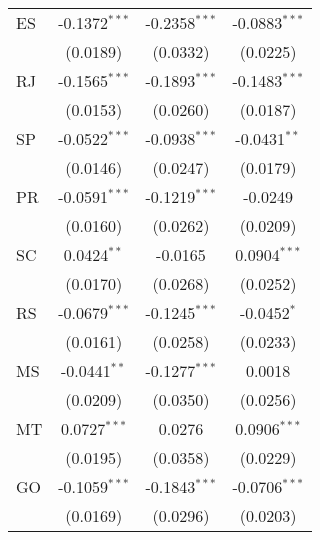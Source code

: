 \begin{tabular}{lccc}
   ES                              & -0.1372$^{***}$              & -0.2358$^{***}$        & -0.0883$^{***}$\\   
                                   & (0.0189)                     & (0.0332)               & (0.0225)\\   
   RJ                              & -0.1565$^{***}$              & -0.1893$^{***}$        & -0.1483$^{***}$\\   
                                   & (0.0153)                     & (0.0260)               & (0.0187)\\   
   SP                              & -0.0522$^{***}$              & -0.0938$^{***}$        & -0.0431$^{**}$\\   
                                   & (0.0146)                     & (0.0247)               & (0.0179)\\   
   PR                              & -0.0591$^{***}$              & -0.1219$^{***}$        & -0.0249\\   
                                   & (0.0160)                     & (0.0262)               & (0.0209)\\   
   SC                              & 0.0424$^{**}$                & -0.0165                & 0.0904$^{***}$\\   
                                   & (0.0170)                     & (0.0268)               & (0.0252)\\   
   RS                              & -0.0679$^{***}$              & -0.1245$^{***}$        & -0.0452$^{*}$\\   
                                   & (0.0161)                     & (0.0258)               & (0.0233)\\   
   MS                              & -0.0441$^{**}$               & -0.1277$^{***}$        & 0.0018\\   
                                   & (0.0209)                     & (0.0350)               & (0.0256)\\   
   MT                              & 0.0727$^{***}$               & 0.0276                 & 0.0906$^{***}$\\   
                                   & (0.0195)                     & (0.0358)               & (0.0229)\\   
   GO                              & -0.1059$^{***}$              & -0.1843$^{***}$        & -0.0706$^{***}$\\   
                                   & (0.0169)                     & (0.0296)               & (0.0203)\\   

\end{tabular}
